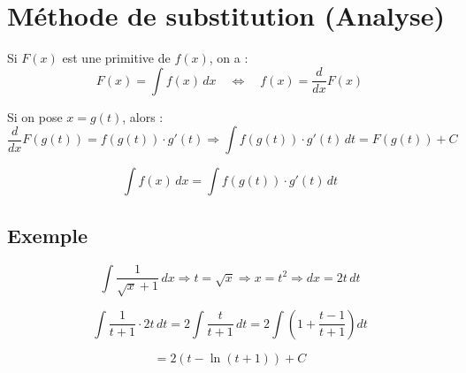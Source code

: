 \documentclass{article}
\begin{document}
\section*{Méthode de substitution (Analyse)}

Si $F(x)$ est une primitive de $f(x)$, on a :
\[
F(x) = \int f(x) \, dx \quad \Leftrightarrow \quad f(x) = \frac{d}{dx} F(x)
\]

Si on pose $x = g(t)$, alors :
\[
\frac{d}{dx} F(g(t)) = f(g(t)) \cdot g'(t) \Rightarrow \int f(g(t)) \cdot g'(t) \, dt = F(g(t)) + C
\]

\[
\boxed{\int f(x) \, dx = \int f(g(t)) \cdot g'(t) \, dt}
\]

\subsection*{Exemple}

\[
\int \frac{1}{\sqrt{x} + 1} \, dx
\Rightarrow t = \sqrt{x} \Rightarrow x = t^2 \Rightarrow dx = 2t \, dt
\]

\[
\int \frac{1}{t + 1} \cdot 2t \, dt = 2 \int \frac{t}{t + 1} \, dt
= 2 \int \left( 1 + \frac{t - 1}{t + 1} \right) dt
\]

\[
= 2 \left( t - \ln(t + 1) \right) + C
\]
\end{document}
